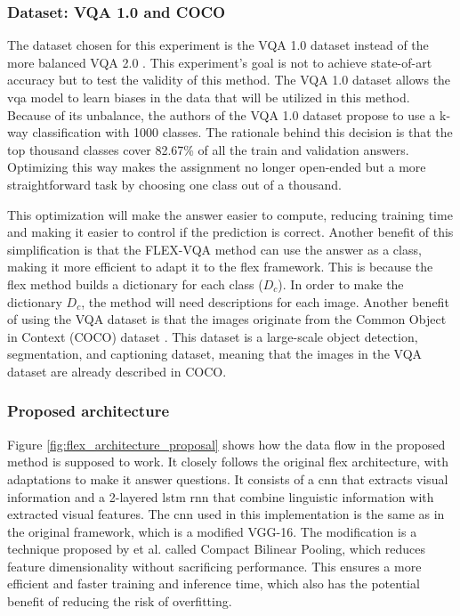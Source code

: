         \subsubsection{Dataset: VQA 1.0 and COCO}
        The dataset chosen for this experiment is the VQA 1.0 dataset \cite{agrawalVQAVisualQuestion2016} instead of the more balanced VQA 2.0 \cite{goyalMakingVQAMatter2017}. 
        This experiment's goal is not to achieve state-of-art accuracy but to test the validity of this method. The VQA 1.0 dataset allows the \gls{vqa} model to learn biases in the data that will be utilized in this method. Because of its unbalance, the authors of the VQA 1.0 dataset propose to use a k-way classification with 1000 classes. The rationale behind this decision is that the top thousand classes cover 82.67\% of all the train and validation answers. Optimizing this way makes the assignment no longer open-ended but a more straightforward task by choosing one class out of a thousand. 
        
        This optimization will make the answer easier to compute, reducing training time and making it easier to control if the prediction is correct. Another benefit of this simplification is that the FLEX-VQA method can use the answer as a class, making it more efficient to adapt it to the \gls{flex} framework. This is because the \gls{flex} method builds a dictionary for each class ($D_c$). 
        In order to make the dictionary $D_c$, the method will need descriptions for each image. 
        Another benefit of using the VQA dataset is that the images originate from the Common Object in Context (COCO) dataset \cite{linMicrosoftCOCOCommon2015}. This dataset is a large-scale object detection, segmentation, and captioning dataset, meaning that the images in the VQA dataset are already described in COCO. 
       

        \subsubsection{Proposed architecture}
        \label{sec3:proposed_architecture}
        
        Figure \ref{fig:flex_architecture_proposal} shows how the data flow in the proposed method is supposed to work. It closely follows the original \gls{flex} architecture, with adaptations to make it answer questions. It consists of a \gls{cnn} that extracts visual information and a 2-layered \gls{lstm} \cite{hochreiterLongShorttermMemory1997} \gls{rnn} that combine linguistic information with extracted visual features. 
        The \gls{cnn} used in this implementation is the same as in the original framework, which is a modified VGG-16. The modification is a technique proposed by \cite{gaoCompactBilinearPooling2016} et al. called Compact Bilinear Pooling, which reduces feature dimensionality without sacrificing performance. This ensures a more efficient and faster training and inference time, which also has the potential benefit of reducing the risk of overfitting.


